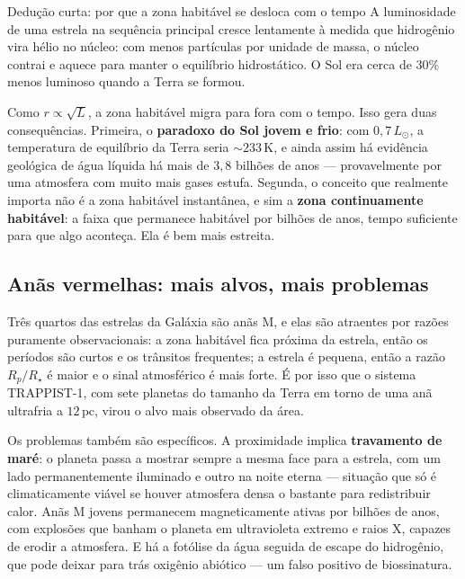 \documentclass[11pt,a4paper]{article}
\begin{document}
\begin{lessonblock}[borderline west={2pt}{0pt}{astroGold}]{Dedução curta: por que a zona habitável se desloca com o tempo}
A luminosidade de uma estrela na sequência principal cresce lentamente à medida que hidrogênio vira hélio no núcleo: com menos partículas por unidade de massa, o núcleo contrai e aquece para manter o equilíbrio hidrostático. O Sol era cerca de $30\%$ menos luminoso quando a Terra se formou.

Como $r\propto\sqrt{L}$, a zona habitável migra para fora com o tempo. Isso gera duas consequências. Primeira, o \textbf{paradoxo do Sol jovem e frio}: com $0{,}7\,L_\odot$, a temperatura de equilíbrio da Terra seria $\sim233\,\mathrm{K}$, e ainda assim há evidência geológica de água líquida há mais de $3{,}8$ bilhões de anos --- provavelmente por uma atmosfera com muito mais gases estufa. Segunda, o conceito que realmente importa não é a zona habitável instantânea, e sim a \textbf{zona continuamente habitável}: a faixa que permanece habitável por bilhões de anos, tempo suficiente para que algo aconteça. Ela é bem mais estreita.
\end{lessonblock}

\subsection*{Anãs vermelhas: mais alvos, mais problemas}

Três quartos das estrelas da Galáxia são anãs M, e elas são atraentes por razões puramente observacionais: a zona habitável fica próxima da estrela, então os períodos são curtos e os trânsitos frequentes; a estrela é pequena, então a razão $R_p/R_\star$ é maior e o sinal atmosférico é mais forte. É por isso que o sistema TRAPPIST-1, com sete planetas do tamanho da Terra em torno de uma anã ultrafria a $12\,\mathrm{pc}$, virou o alvo mais observado da área.

Os problemas também são específicos. A proximidade implica \textbf{travamento de maré}: o planeta passa a mostrar sempre a mesma face para a estrela, com um lado permanentemente iluminado e outro na noite eterna --- situação que só é climaticamente viável se houver atmosfera densa o bastante para redistribuir calor. Anãs M jovens permanecem magneticamente ativas por bilhões de anos, com explosões que banham o planeta em ultravioleta extremo e raios X, capazes de erodir a atmosfera. E há a fotólise da água seguida de escape do hidrogênio, que pode deixar para trás oxigênio abiótico --- um falso positivo de biossinatura.
\end{document}

